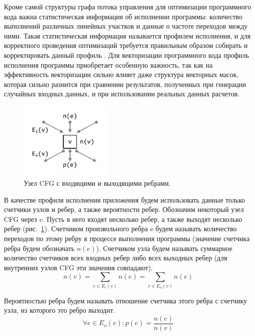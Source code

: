 Кроме самой структуры графа потока управления для оптимизации программного кода важна статистическая информация об исполнении программы: количество выполнений различных линейных участков и данные о частоте переходов между ними.
Такая статистическая информация называется профилем исполнения, и для корректного проведения оптимизаций требуется правильным образом собирать и корректировать данный профиль \cite{Chetverina2015Profile}.
Для векторизации программного кода профиль исполнения программы приобретает особенную важность, так как на эффективность векторизации сильно влияет даже структура векторных масок, которая сильно разнится при сравнении результатов, полученных при генерации случайных входных данных, и при использовании реальных данных расчетов.

\begin{figure}[ht]
\centering
\includegraphics[width=0.4\textwidth]{./pics/text_4_flat/cfg.pdf}
\singlespacing
{}\caption{Узел CFG с входящими и выходящими ребрами.}
\label{fig:text_4_vec_flat_cfg}
\end{figure}

В качестве профиля исполнения приложения будем использовать данные только счетчики узлов и ребер, а также вероятности ребер. Обозначим некоторый узел CFG через $v$.
Пусть в него входят несколько ребер, а также выходят несколько ребер (рис.~\ref{fig:text_4_vec_flat_cfg}).
Счетчиком произвольного ребра e будем называть количество переходов по этому ребру в процессе выполнения программы (значение счетчика ребра будем обозначать $n(e)$).
Счетчиком узла будем называть суммарное количество счетчиков всех входных ребер либо всех выходных ребер (для внутренних узлов CFG эти значения совпадают).
\begin{equation}
	n(v) = \sum_{e \in E_i(v)}{n(e)} = \sum_{e \in E_o(v)}{n(e)}
\end{equation}

Вероятностью ребра будем называть отношение счетчика этого ребра с счетчику узла, из которого это ребро выходит.
\begin{equation}
	\forall e \in E_o(v): p(e) = \frac{n(e)}{n(v)}
\end{equation}

